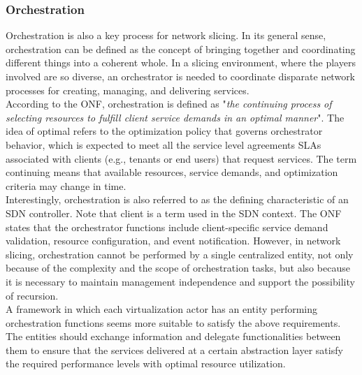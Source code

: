 \documentclass[a4paper,12pt]{report} %
\begin{document}
\subsubsection{Orchestration}
Orchestration is also a key process for network
slicing. In its general sense, orchestration can be
defined as the concept of bringing together and coordinating different things into a coherent whole.
In a slicing environment, where the players involved
are so diverse, an orchestrator is needed to coordinate disparate network processes for
creating, managing, and delivering services.\\
According to the \gls{ONF},
orchestration is defined as "\textit{the continuing process of
selecting resources to fulfill client service demands
in an optimal manner}". The idea of optimal refers
to the optimization policy that governs orchestrator behavior, which is expected to meet all the service level agreements \gls{SLA}s associated with clients (e.g., tenants or end users)
that request services. The term continuing means
that available resources, service demands, and optimization criteria may change in time. \\
Interestingly, orchestration is also referred to as the defining
characteristic of an SDN controller. Note that client
is a term used in the SDN context.
The ONF states that the orchestrator functions
include client-specific service demand validation,
resource configuration, and event notification.
However, in network slicing, orchestration cannot be performed by a single centralized entity,
not only because of the complexity and the
scope of orchestration tasks, but also because it
is necessary to maintain management independence and support the possibility of recursion. \\
A framework in which each virtualization
actor has an entity performing orchestration functions seems more suitable to satisfy the
above requirements. The entities should exchange
information and delegate functionalities between
them to ensure that the services delivered at a
certain abstraction layer satisfy the required performance levels with optimal resource utilization.
\end{document}
